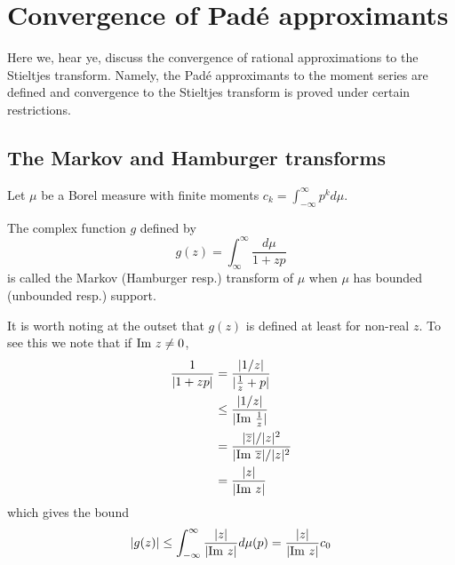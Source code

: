 

\chapter{Convergence of Pad\'e approximants}{}

Here we, hear ye, discuss the convergence of rational approximations to the Stieltjes transform. Namely, the Pad\'e approximants to the moment series are defined and convergence to the Stieltjes transform is proved under certain restrictions.

\section{The Markov and Hamburger transforms}

Let $\mu$ be a Borel measure with finite moments $c_k = \int_{-\infty}^\infty p^k d\mu$. 

\begin{definition}
  The complex function $g$ defined by
  \[
    g(z) = \int_\infty^\infty\frac{d\mu}{1+zp}
  \]
  is called the Markov (Hamburger resp.) transform of $\mu$ when $\mu$ has bounded (unbounded resp.) support.
\end{definition}

It is worth noting at the outset that $g(z)$ is defined at least for non-real $z$. To see this we note that if $\text{Im}~ z \neq 0$,
\begin{align*}
  \frac1{|1 + zp|} 
  &= \frac{|1/z|}{|\frac1z + p|} \\
  &\leq \frac{|1/z|}{|\text{Im}~ \frac1z|} \\
  &= \frac{|\overline{z}|/|z|^2}{|\text{Im}~ \overline{z}|/|z|^2} \\
  &= \frac{|z|}{|\text{Im}~ z|}
\end{align*}
which gives the bound
\begin{equation}
  |g(z)| 
  \leq \int_{-\infty}^\infty \frac{|z|}{|\text{Im}~ z|} d\mu(p) 
  = \frac{|z|}{|\text{Im}~ z|}c_0
\end{equation}

